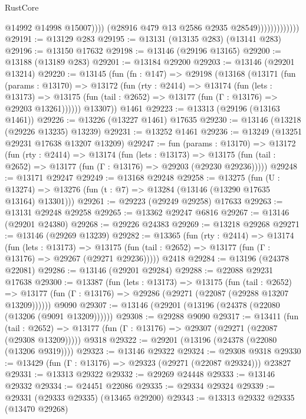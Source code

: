 \begin{lexlean}{RustCore}
\begin{coremodule}
                                    @14992
                                    @14998
                                    @15007))))
                            (@28916 @479 @13 @2586 @2935 @28549)))))))))))))
@29191 := @13129 @283
@29195 := @13131 (@13135 @283) (@13141 @283)
@29196 := @13150 @17632
@29198 := @13146 (@29196 @13165)
@29200 := @13188 (@13189 @283)
@29201 := @13184 @29200
@29203 := @13146 (@29201 @13214)
@29220 := @13145
    (fun (fn : @147) =>
    @29198
      (@13168
        (@13171
          (fun (params : @13170) =>
          @13172
            (fun (rty : @2414) =>
            @13174
              (fun (lets : @13173) =>
              @13175 (fun (tail : @2652) => @13177 (fun (Γ : @13176) => @29203 @13261))))))
        @13307))
    @1461
@29223 := @13313 (@29196 (@13163 @1461))
@29226 := @13226 (@13227 @1461) @17635
@29230 := @13146 (@13218 (@29226 @13235) @13239)
@29231 := @13252 @1461
@29236 := @13249 (@13251 @29231 @17638 @13207 @13209)
@29247 := fun (params : @13170) =>
  @13172
    (fun (rty : @2414) =>
    @13174
      (fun (lets : @13173) =>
      @13175 (fun (tail : @2652) => @13177 (fun (Γ : @13176) => @29203 (@29230 @29236)))))
@29248 := @13171 @29247
@29249 := @13168 @29248
@29258 := @13275
    (fun (U : @13274) => @13276 (fun (t : @7) => @13284 (@13146 (@13290 @17635 @13164) @13301)))
@29261 := @29223 (@29249 @29258) @17633
@29263 := @13131 @29248 @29258
@29265 := @13362 @29247 @6816
@29267 := @13146 (@29201 @24380)
@29268 := @29226 @24383
@29269 := @13218 @29268
@29271 := @13146 (@29269 @13239)
@29282 := @13365
    (fun (rty : @2414) =>
    @13174
      (fun (lets : @13173) =>
      @13175 (fun (tail : @2652) => @13177 (fun (Γ : @13176) => @29267 (@29271 @29236)))))
    @2418
@29284 := @13196 (@24378 @22081)
@29286 := @13146 (@29201 @29284)
@29288 := @22088 @29231 @17638
@29300 := @13387
    (fun (lets : @13173) =>
    @13175
      (fun (tail : @2652) =>
      @13177 (fun (Γ : @13176) => @29286 (@29271 (@22087 (@29288 @13207 @13209))))))
    @9090
@29307 := @13146 (@29201 (@13196 (@24378 (@22080 (@13206 (@9091 @13209))))))
@29308 := @29288 @9090
@29317 := @13411
    (fun (tail : @2652) => @13177 (fun (Γ : @13176) => @29307 (@29271 (@22087 (@29308 @13209)))))
    @9318
@29322 := @29201 (@13196 (@24378 (@22080 (@13206 @9319))))
@29323 := @13146 @29322
@29324 := @29308 @9318
@29330 := @13429 (fun (Γ : @13176) => @29323 (@29271 (@22087 @29324))) @23827
@29331 := @13313 @29322
@29332 := @29269 @24448
@29333 := @13146 @29332
@29334 := @24451 @22086
@29335 := @29334 @29324
@29339 := @29331 (@29333 @29335) (@13465 @29200)
@29343 := @13313 @29332 @29335 (@13470 @29268)

\end{coremodule}
\end{lexlean}

